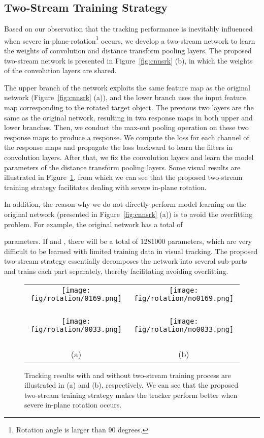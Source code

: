 \documentclass[10pt,twocolumn,letterpaper]{article}
\begin{document}
\subsection{Two-Stream Training Strategy}
Based on our observation that the tracking performance is inevitably influenced
when severe in-plane-rotation\footnote{Rotation angle is larger than 90 degrees.}
occurs, we develop a two-stream network to learn the weights of convolution and
distance transform pooling layers. The proposed two-stream network is presented
in Figure~\ref{fig:cnnsrk} (b), in which the weights of the convolution layers are shared.

The upper branch of the network exploits the same feature map as the original
network (Figure~\ref{fig:cnnsrk} (a)), and the lower branch uses the input
feature map corresponding to the rotated target object.
The previous two layers are the same as the original network, resulting in two
 response maps in both upper and lower branches.
Then, we conduct the max-out pooling operation on these two response maps to
produce a  response.
We compute the loss for each channel of the response maps and propagate the
loss backward to learn the filters in convolution layers.
After that, we fix the convolution layers and learn the model parameters of
the distance transform pooling layers.
Some visual results are illustrated in Figure~\ref{fig:rotation_result},
from which we can see that the proposed two-stream training strategy
facilitates dealing with severe in-plane rotation.

In addition, the reason why we do not directly perform model learning on
the original network (presented in Figure~\ref{fig:cnnsrk} (a)) is to avoid
the overfitting problem. For example, the original network has a total of

parameters. If  and , there will be a total of
1281000 parameters, which are very difficult to be learned with limited training
data in visual tracking. The proposed two-stream strategy essentially
decomposes the network into several sub-parts and trains
each part separately, thereby facilitating avoiding overfitting.

\begin{figure}[t]
\centering
\begin{tabular}{c@{}c}
\texttt{[image: fig/rotation/0169.png]}
\ &
\texttt{[image: fig/rotation/no0169.png]}
\ \\
\texttt{[image: fig/rotation/0033.png]}
\ &
\texttt{[image: fig/rotation/no0033.png]}
\ \\
(a) & (b)
\end{tabular}
\caption{Tracking results with and without two-stream training
process are illustrated in (a) and (b), respectively. We can see
that the proposed two-stream training strategy makes the tracker
perform better when severe in-plane rotation occurs. }
\label{fig:rotation_result}
\end{figure}
\end{document}

